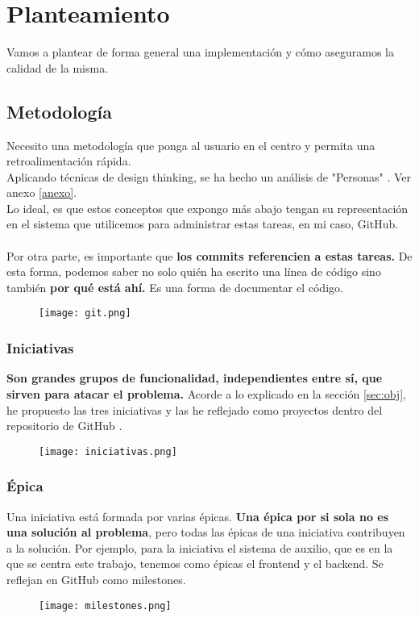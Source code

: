\chapter{Planteamiento}

Vamos a plantear de forma general una implementación y cómo aseguramos la calidad de la misma.

\section{Metodología}

Necesito una metodología que ponga al usuario en el centro y permita una retroalimentación rápida.\\
Aplicando técnicas de design thinking, se ha hecho un análisis de "Personas" \cite{personas}. Ver anexo \ref{anexo}.
\\
Lo ideal, es que estos conceptos que expongo más abajo tengan su representación en el sistema que utilicemos
para administrar estas tareas, en mi caso, GitHub. \\ \\
Por otra parte, es importante que \textbf{los commits referencien a estas tareas.} De esta forma, podemos
saber no solo quién ha escrito una línea de código sino también \textbf{por qué está ahí.} Es una forma de documentar el código.
\begin{figure}[H]
\centering	
\texttt{[image: git.png]}
\end{figure}
\subsection{Iniciativas}
\textbf{Son grandes grupos de funcionalidad, independientes entre sí, que sirven para atacar el problema.}
Acorde a lo explicado en la sección \ref{sec:obj}, he propuesto las tres iniciativas y las he 
reflejado como proyectos dentro del repositorio de GitHub \cite{repo}.
\begin{figure}[H]
\centering	
\texttt{[image: iniciativas.png]}
\end{figure}

\subsection{Épica}
Una iniciativa está formada por varias épicas. \textbf{Una épica por si sola no es una solución al problema}, pero todas las épicas de una iniciativa contribuyen a la solución.
Por ejemplo, para la iniciativa el sistema de auxilio, que es en la que se centra este trabajo, tenemos 
como épicas el frontend y el backend. Se reflejan en GitHub como milestones.
\begin{figure}[H]
	\centering
\texttt{[image: milestones.png]}
\end{figure}


